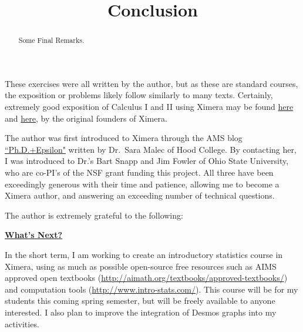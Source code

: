 \documentclass{ximera}
\title{Conclusion}
\begin{document}
      
\begin{abstract}
      
Some Final Remarks.      
\end{abstract}
      
\maketitle
      
      
These exercises were all written by the author, but as these are standard courses, the exposition or problems likely follow similarly to many texts.  Certainly, extremely good exposition of Calculus I and II using Ximera may be found \href{http://ximera.osu.edu/course/mooculus/calculus1/}{here} and \href{http://ximera.osu.edu/course/mooculus/calculus2/}{here}, by the original founders of Ximera.

The author was first introduced to Ximera through the AMS blog \href{http://blogs.ams.org/phdplus/2016/08/31/the-ximera-project-turning-latex-into-interactive-websites/#sthash.b9OeivZv.dpbs}{``Ph.D.+Epsilon"} written by Dr.\  Sara Malec of Hood College.  By contacting her, I was introduced to Dr.'s Bart Snapp and Jim Fowler of Ohio State University, who are co-PI's of the NSF grant funding this project.  All three have been exceedingly generous with their time and patience, allowing me to become a Ximera author, and answering an exceeding number of technical questions.

\begin{question}
The author is extremely grateful to the following:
\begin{selectAll}



\end{selectAll}
\end{question}

\textbf{\underline{What's Next?}}

In the short term, I am working to create an introductory statistics course in Ximera, using as much as possible open-source free resources such as AIMS approved open textbooks (\url{http://aimath.org/textbooks/approved-textbooks/}) and computation tools (\url{http://www.intro-stats.com/}).  This course will be for my students this coming spring semester, but will be freely available to anyone interested.  I also plan to improve the integration of Desmos graphs into my activities.
\end{document}
